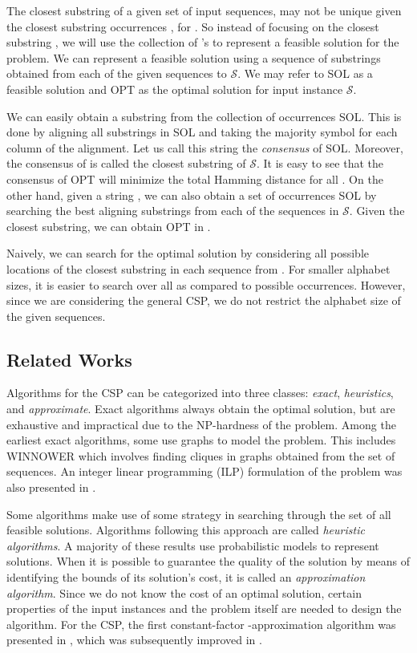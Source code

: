 \documentclass[journal]{acm_proc_article-sp}
\def\S{\ensuremath{\mathcal{S}}\xspace}
\begin{document}
The closest substring of a given set of input sequences, may not be unique given the closest substring  occurrences , for .  So instead of focusing on the closest substring , we will use the collection of 's to represent a feasible solution for the problem. We can represent a feasible solution  using a sequence of substrings obtained from each of the given sequences to \S. We may refer to SOL as a feasible solution and OPT as the optimal solution for input instance \S.

We can easily obtain a substring  from the collection of occurrences SOL. This is done by aligning all substrings in SOL and taking the majority symbol for each column of the alignment. Let us call this string the \textit{consensus} of SOL. Moreover, the consensus of  is called the closest substring of \S. It is easy to see that the consensus of OPT will minimize the total Hamming distance for all  . On the other hand, given a string , we can also obtain a set of occurrences SOL by searching the best aligning substrings from each of the sequences in \S. Given the closest substring, we can obtain OPT in . 

Naively, we can search for the optimal solution by considering all possible locations of the closest substring in each sequence  from . For smaller alphabet sizes, it is easier to search over all  as compared to  possible occurrences. However, since we are considering the general CSP, we do not restrict the alphabet size of the given sequences. 


\subsection{Related Works}
Algorithms for the CSP can be categorized into three classes: \textit{exact}, \textit{heuristics}, and \textit{approximate}. Exact algorithms always obtain the optimal solution, but are exhaustive and impractical due to the NP-hardness of the problem. Among the earliest exact algorithms, some use graphs to model the problem. This includes WINNOWER \cite{Pevzner2000} which involves finding cliques in graphs obtained from the set of sequences. An integer linear programming (ILP) formulation of the problem was also presented in \cite{Zaslavsky2006}.

Some algorithms make use of some strategy in searching through the set of all feasible solutions. Algorithms following this approach  are called \textit{heuristic algorithms}. A majority of these results use probabilistic models to represent solutions. When it is possible to guarantee the quality of the solution by means of identifying the bounds of its solution's cost, it is called an \textit{approximation algorithm}. Since we do not know the cost of an optimal solution, certain properties of the input instances and the problem itself are needed to design the algorithm. For the CSP, the first constant-factor -approximation algorithm was presented in \cite{Lanctot1998}, which was subsequently  improved in \cite{Li1999}.
\end{document}
